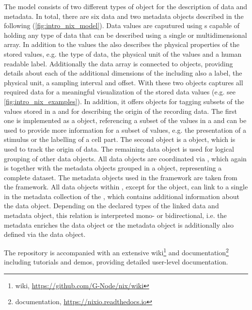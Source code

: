 The  model consists of two different types of object for the description of data and metadata. In total, there are six data and two metadata objects  described in the following (\ref{fig:intro_nix_model}).
Data values are caputured using s capable of holding any type of data that can be described using a single or multidimensional array. In addition to the values the  also describes the physical properties of the stored values, e.g. the type of data, the physical unit of the values and a human readable label. Additionally the data array is connected to  objects, providing details about each of the additional dimensions of the  including also a label, the physical unit, a sampling interval and offset. With these two objects  captures all required data for a meaningful visualization of the stored data values (e.g. see \cref{fig:intro_nix_examples}). In addition, it offers objects for tagging subsets of the values stored in a  and for describing the origin of the recording data. The first one is implemented as a  object, referencing a subset of the values in a  and can be used to provide more information for a subset of values, e.g. the presentation of a stimulus or the labelling of a cell part. The second object is a  object, which is used to track the origin of data. The remaining data object  is used for logical grouping of other  data objects. All data objects are coordinated via , which again is together with the metadata objects grouped in a   object, representing a complete dataset.
The metadata objects used in the  framework are taken from the  framework. All data objects within , except for the  object, can link to a single  in the metadata collection of the  , which contains additional information about the data object. Depending on the declared types of the linked data and metadata object, this relation is interpreted mono- or bidirectional, i.e. the metadata  enriches the data object or the metadata object is additionally also defined via the data object.

The  repository is accompanied with an extensive wiki\footnote{ wiki, \url{https://github.com/G-Node/nix/wiki}} and documentation\footnote{ documentation, \url{https://nixio.readthedocs.io}} including tutorials and demos, providing detailed user-level documentation.

